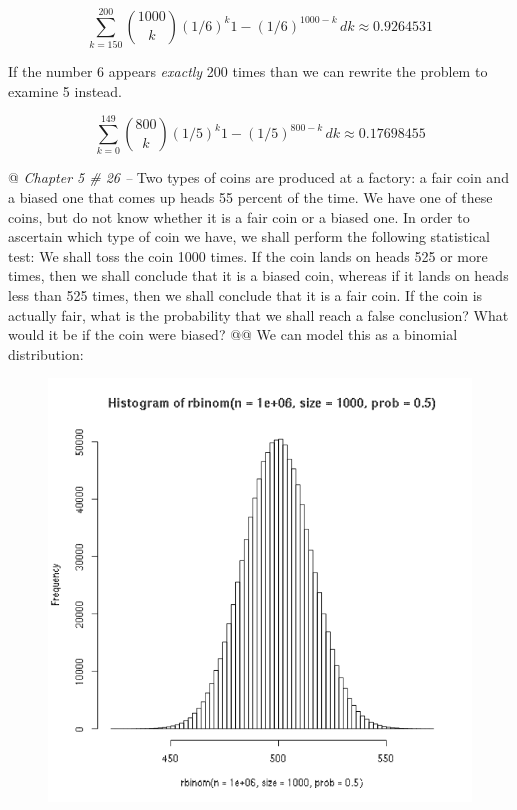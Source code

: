 \documentclass[10pt]{article}
\begin{document}
\begin{easylist}[enumerate]
    \[ \sum^{200}_{k=150} \binom{1000}{k} {(1/6)}^k {1 - (1/6)}^{1000 - k} \, dk \approx 0.9264531 \]

    If the number 6 appears \textit{exactly} 200 times than we can rewrite the problem to examine 5 instead.

    \[ \sum^{149}_{k=0} \binom{800}{k} {(1/5)}^k {1 - (1/5)}^{800 - k} \, dk \approx 0.17698455 \]

    @ \textit{Chapter 5 \# 26 --} Two types of coins are produced at a factory: a fair coin and a biased one that comes
    up heads 55 percent of the time. We have one of these coins, but do not know whether it is a fair coin or a biased
    one. In order to ascertain which type of coin we have, we shall perform the following statistical test: We shall
    toss the coin 1000 times. If the coin lands on heads 525 or more times, then we shall conclude that it is a biased
    coin, whereas if it lands on heads less than 525 times, then we shall conclude that it is a fair coin. If the coin
    is actually fair, what is the probability that we shall reach a false conclusion?  What would it be if the coin were
    biased?
    @@ We can model this as a binomial distribution:

    \begin{figure}[!ht]
        \centering
        \includegraphics[scale=0.5]{./img/binomial.png}
    \end{figure}


\end{easylist}
\end{document}
